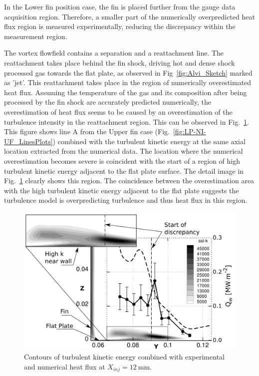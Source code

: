 \documentclass{AIAA}
\begin{document}
In the Lower fin position case, the fin is placed further from the gauge data acquisition region. Therefore, a smaller part of the numerically overpredicted heat flux region is measured experimentally, reducing the discrepancy within the measurement region.

The vortex flowfield contains a separation and a reattachment line. The reattachment takes place behind the fin shock, driving hot and dense shock processed gas towards the flat plate, as observed in Fig~\ref{fig:Alvi_Sketch} marked as 'jet'. This reattachment takes place in the region of numerically overestimated heat flux. Assuming the temperature of the gas and its composition after being processed by the fin shock are accurately predicted numerically, the overestimation of heat flux seems to be caused by an overestimation of the turbulence intensity in the reattachment region. This can be observed in Fig.~\ref{fig:SSTk_Q_Combi}. This figure shows line A from the Upper fin case (Fig.~\ref{fig:LP-NI-UF_LinesPlots}) combined with the turbulent kinetic energy at the same axial location extracted from the numerical data. The location where the numerical overestimation becomes severe is coincident with the start of a region of high turbulent kinetic energy adjacent to the flat plate surface. The detail image in Fig.~\ref{fig:SSTk_Q_Combi} clearly shows this region. The coincidence between the overestimation area with the high turbulent kinetic energy adjacent to the flat plate suggests the turbulence model is overpredicting turbulence and thus heat flux in this region.
%
\begin{figure}[!h]
\center
\includegraphics[width=0.70\columnwidth,valign=t]{Figures/SST-K_X137_LP_NI_UF_Q_and_SSTk_Combined.pdf}
\caption{Contours of turbulent kinetic energy combined with experimental and numerical heat flux at $X_{inj} = \SI{12}{\milli\meter}$.}
\label{fig:SSTk_Q_Combi}
\end{figure} 
\end{document}
